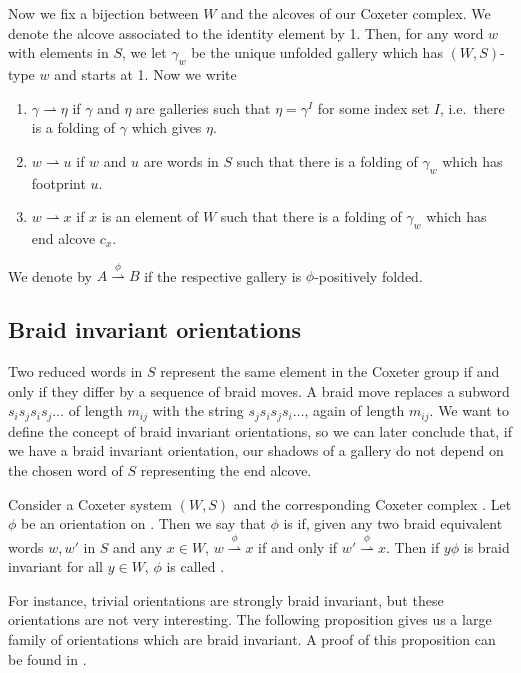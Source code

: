 \documentclass[11pt]{article}
\begin{document}
Now we fix a bijection between $W$ and the alcoves of our Coxeter complex. We denote the alcove associated to the identity element by 1. Then, for any word $w$ with elements in $S$, we let $\gamma_w$ be the unique unfolded gallery which has $(W,S)$-type $w$ and starts at 1. Now we write
\begin{enumerate}
    \item $\gamma \rightharpoonup \eta$ if $\gamma$ and $\eta$ are galleries such that $\eta = \gamma^I$ for some index set $I$, i.e.\ there is a folding of $\gamma$ which gives $\eta$.
    \item $w\rightharpoonup u$ if $w$ and $u$ are words in $S$ such that there is a folding of $\gamma_w$ which has footprint $u$.
    \item $w\rightharpoonup x$ if $x$ is an element of $W$ such that there is a folding of $\gamma_w$ which has end alcove $c_x$. 
\end{enumerate}
We denote by $A\stackrel{\phi}{\rightharpoonup} B$ if the respective gallery is $\phi$-positively folded.


\subsection{Braid invariant orientations}

Two reduced words in $S$ represent the same element in the Coxeter group if and only if they differ by a sequence of braid moves. A braid move replaces a subword $s_is_js_is_j\hdots $ of length $m_{ij}$ with the string $s_js_is_js_i\hdots $, again of length $m_{ij}$. We want to define the concept of braid invariant orientations, so we can later conclude that, if we have a braid invariant orientation, our shadows of a gallery do not depend on the chosen word of $S$ representing the end alcove. 

\begin{definition}
    Consider a Coxeter system $(W,S)$ and the corresponding Coxeter complex \sg. Let $\phi$ be an orientation on \sg. Then we say that $\phi$ is  if, given any two braid equivalent words $w,w'$ in $S$ and any $x\in W$, $w\stackrel{\phi}{\rightharpoonup} x$ if and only if $w'\stackrel{\phi}{\rightharpoonup} x$. Then if $y\phi$ is braid invariant for all $y\in W$, $\phi$ is called . 
\end{definition}

For instance, trivial orientations are strongly braid invariant, but these orientations are not very interesting. The following proposition gives us a large family of orientations which are braid invariant. A proof of this proposition can be found in \cite[pp.135-138]{SHA}.
\end{document}
